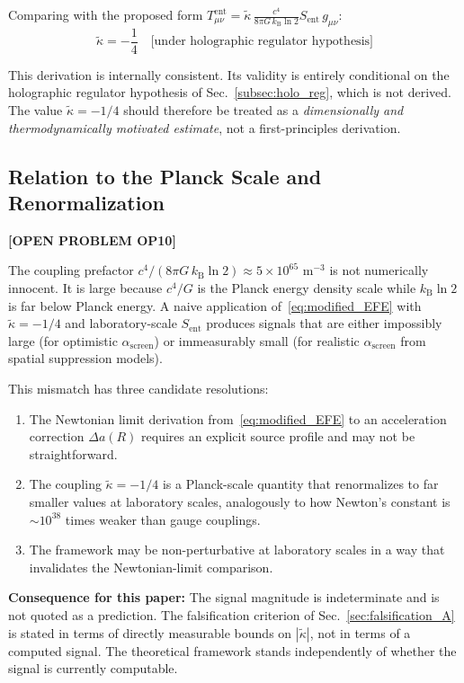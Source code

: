\documentclass[12pt,letterpaper]{article}
\theoremstyle{plain}
\theoremstyle{definition}
\theoremstyle{remark}
\newcommand{\kB}{k_{\mathrm{B}}}
\newcommand{\Sent}{S_{\mathrm{ent}}}
\newcommand{\ascreen}{\alpha_{\mathrm{screen}}}
\begin{document}
Comparing with the proposed form
$T^{\mathrm{ent}}_{\mu\nu} = \tilde{\kappa}\,\frac{c^4}{8\pi G\,\kB\ln 2}
\Sent\,g_{\mu\nu}$:
\begin{equation}
  \boxed{\tilde{\kappa} = -\frac{1}{4}
  \quad\text{[under holographic regulator hypothesis]}}
  \tag{A2.6}
  \label{eq:kappa_value}
\end{equation}

This derivation is internally consistent. Its validity is entirely
conditional on the holographic regulator hypothesis of Sec.~\ref{subsec:holo_reg},
which is not derived. The value $\tilde{\kappa} = -1/4$ should therefore
be treated as a \emph{dimensionally and thermodynamically motivated
estimate}, not a first-principles derivation.

\subsection{Relation to the Planck Scale and Renormalization}
\label{sec:op10}
\textcolor{red!70!black}{\textbf{[OPEN PROBLEM OP10]}}

The coupling prefactor $c^4/(8\pi G\,\kB\ln 2) \approx 5\times10^{65}$
m$^{-3}$ is not numerically innocent. It is large because $c^4/G$ is
the Planck energy density scale while $\kB\ln 2$ is far below Planck
energy. A naive application of~\eqref{eq:modified_EFE} with
$\tilde{\kappa} = -1/4$ and laboratory-scale $\Sent$ produces signals
that are either impossibly large (for optimistic $\ascreen$) or
immeasurably small (for realistic $\ascreen$ from spatial suppression
models).

This mismatch has three candidate resolutions:
\begin{enumerate}
  \item The Newtonian limit derivation from~\eqref{eq:modified_EFE}
    to an acceleration correction $\Delta a(R)$ requires an explicit
    source profile and may not be straightforward.
  \item The coupling $\tilde{\kappa} = -1/4$ is a Planck-scale quantity
    that renormalizes to far smaller values at laboratory scales,
    analogously to how Newton's constant is $\sim10^{38}$ times weaker
    than gauge couplings.
  \item The framework may be non-perturbative at laboratory scales
    in a way that invalidates the Newtonian-limit comparison.
\end{enumerate}

\textbf{Consequence for this paper:} The signal magnitude is indeterminate
and is not quoted as a prediction. The falsification criterion of
Sec.~\ref{sec:falsification_A} is stated in terms of directly measurable
bounds on $|\tilde{\kappa}|$, not in terms of a computed signal. The
theoretical framework stands independently of whether the signal is
currently computable.
\end{document}

